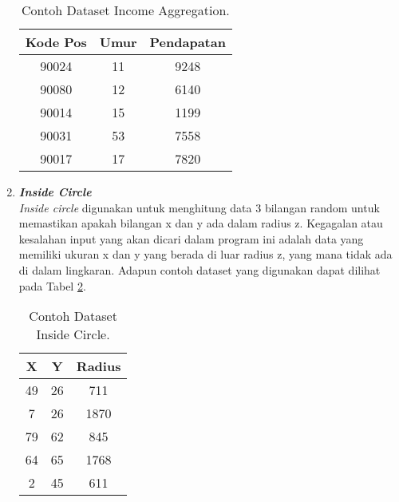 \begin{enumerate}
            \begin{longtable}{|c|c|c|}
                  \caption{Contoh Dataset Income Aggregation.}
                  \label{tb:incomeaggregationdataset} \\
                  \hline
                  \rowcolor[HTML]{C0C0C0}
                  \textbf{Kode Pos} & \textbf{Umur} & \textbf{Pendapatan} \\
                  \hline
                  90024 & 11 & 9248 \\
                  90080 & 12 & 6140 \\
                  90014 & 15 & 1199 \\
                  90031 & 53 & 7558 \\
                  90017 & 17 & 7820 \\
                  \hline
            \end{longtable}

      \item \emph{\textbf{Inside Circle}} \\
            \emph{Inside circle} digunakan untuk menghitung data 3 bilangan random untuk memastikan apakah bilangan x dan y ada dalam radius z. Kegagalan atau kesalahan input yang akan dicari dalam program ini adalah data yang memiliki ukuran x dan y yang berada di luar radius z, yang mana tidak ada di dalam lingkaran.
            Adapun contoh dataset yang digunakan dapat 
            dilihat pada Tabel \ref{tb:insidecircledataset}.

            \begin{longtable}{|c|c|c|}
                  \caption{Contoh Dataset Inside Circle.}
                  \label{tb:insidecircledataset} \\
                  \hline
                  \rowcolor[HTML]{C0C0C0}
                  \textbf{X} & \textbf{Y} & \textbf{Radius} \\
                  \hline
                  49 & 26 & 711 \\
                  7 & 26 & 1870 \\
                  79 & 62 & 845 \\
                  64 & 65 & 1768 \\
                  2 & 45 & 611 \\
                  \hline
            \end{longtable}


\end{enumerate}

